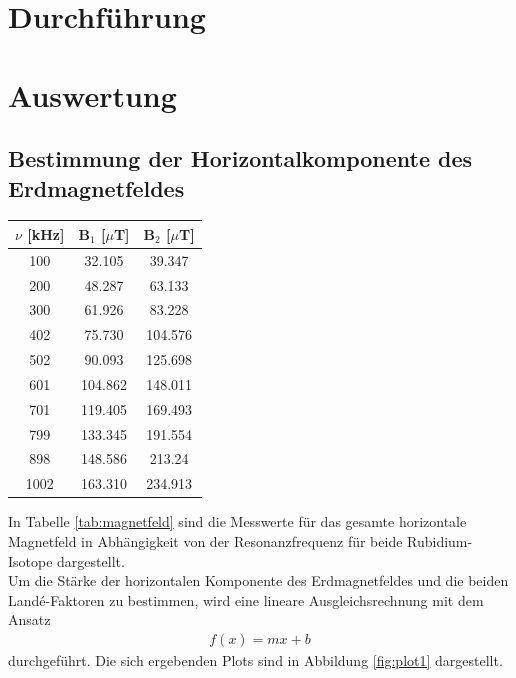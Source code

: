 \documentclass[]{scrartcl}
\begin{document}
\section{Durchführung}


\section{Auswertung}

\subsection{Bestimmung der Horizontalkomponente des Erdmagnetfeldes}

\begin{center}
	\begin{tabular}{|c|c|c|}
	\hline $\nu$ [kHz] & B$_1$ [$\mu$T] & B$_2$ [$\mu$T] \\
	\hline	100	&	32.105	&	39.347	\\
	\hline	200	&	48.287	&	63.133	\\
	\hline	300	&	61.926	&	83.228	\\
	\hline	402	&	75.730	&	104.576	\\
	\hline	502	&	90.093	&	125.698	\\
	\hline	601	&	104.862	&	148.011	\\
	\hline	701	&	119.405	&	169.493	\\
	\hline	799	&	133.345	&	191.554	\\
	\hline	898	&	148.586	&	213.24	\\
	\hline	1002	&	163.310	&	234.913	\\
	\hline 
	\end{tabular}
\label{tab:magnetfeld}
\end{center}
In Tabelle \ref{tab:magnetfeld} sind die Messwerte für das gesamte horizontale Magnetfeld in Abhängigkeit von der Resonanzfrequenz für beide Rubidium-Isotope dargestellt. \\
Um die Stärke der horizontalen Komponente des Erdmagnetfeldes und die beiden Landé-Faktoren zu bestimmen, wird eine lineare Ausgleichsrechnung mit dem Ansatz
\begin{align}
f(x)=mx+b
\end{align}
durchgeführt. Die sich ergebenden Plots sind in Abbildung \ref{fig:plot1} dargestellt.
\end{document}
